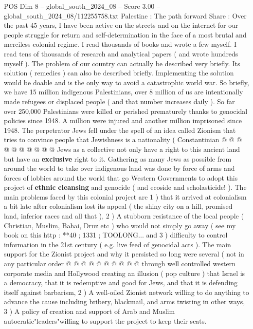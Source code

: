 \begin{textsample}{POS Dim 8 – global\_south\_2024\_08 – Score 3.00 – global\_south\_2024\_08/112255758.txt}  \label{ex:f8_pos_380}
Palestine : The path forward Share : Over the past 45 years, I have been active on the streets and on the internet for our people struggle for return and self-determination in the face of a most brutal and merciless colonial regime.
I read thousands of books and wrote a few myself.
I read tens of thousands of research and analytical papers ( and wrote hundreds myself ).
The problem of our country can actually be described very briefly.
Its solution ( remedies ) can also be described briefly.
Implementing the solution would be doable and is the only way to avoid a catastrophic world war.
So briefly, we have 15 million indigenous Palestinians, over 8 million of us are intentionally made refugees or displaced people ( and that number increases daily ).
So far over 250,000 Palestinians were killed or perished prematurely thanks to genocidal policies since 1948.
A million were injured and another million imprisoned since 1948.
The perpetrator Jews fell under the spell of an idea called Zionism that tries to convince people that Jewishness is a nationality ( Constantinian @ @ @ @ @ @ @ @ @ @ Jews as a collective not only have a right to this ancient land but have an \textbf{exclusive} right to it.
Gathering as many Jews as possible from around the world to take over indigenous land was done by force of arms and forces of lobbies around the world that go Western Governments to adopt this project of \textbf{ethnic} \textbf{cleansing} and genocide ( and ecoside and scholasticide! ).
The main problems faced by this colonial project are 1 ) that it arrived at colonialism a bit late after colonialism lost its appeal ( the shiny city on a hill, promised land, inferior races and all that ), 2 ) A stubborn resistance of the local people ( Christian, Muslim, Bahai, Druz etc ) who would not simply go away ( see my book on this http : **40 ; 1331 ; TOOLONG... and 3 ) difficulty to control information in the 21st century ( e.g. live feed of genocidal acts ).
The main support for the Zionist project and why it persisted so long were several ( not in any particular order @ @ @ @ @ @ @ @ @ @ through well controlled western corporate media and Hollywood creating an illusion ( pop culture ) that Israel is a democracy, that it is redemptive and good for Jews, and that it is defending itself against barbarism, 2 ) A well-oiled Zionist network willing to do anything to advance the cause including bribery, blackmail, and arms twisting in other ways, 3 ) A policy of creation and support of Arab and Muslim autocratic"leaders"willing to support the project to keep their seats.

\end{textsample}
